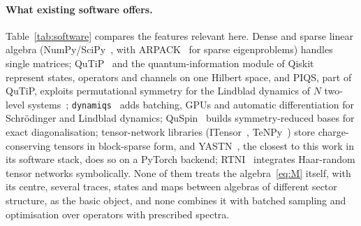 \documentclass[11pt]{article}
\begin{document}
\paragraph{What existing software offers.} Table~\ref{tab:software} compares the features relevant here.
Dense and sparse linear algebra (NumPy/SciPy~\cite{harris2020,virtanen2020}, with ARPACK~\cite{lehoucq1998} for
sparse eigenproblems) handles single matrices; QuTiP~\cite{johansson2013,lambert2026} and the quantum-information module of
Qiskit~\cite{qiskit2019} represent states, operators and channels on one Hilbert space, and PIQS, part of QuTiP,
exploits permutational symmetry for the Lindblad dynamics of $N$ two-level systems~\cite{shammah2018}; \texttt{dynamiqs}~\cite{dynamiqs}
adds batching, GPUs and automatic differentiation for Schrödinger and Lindblad dynamics; QuSpin~\cite{weinberg2017}
builds symmetry-reduced bases for exact diagonalisation; tensor-network libraries (ITensor~\cite{fishman2022},
TeNPy~\cite{hauschild2018}) store charge-conserving tensors in block-sparse form, and YASTN~\cite{rams2025}, the
closest to this work in its software stack, does so on a PyTorch backend; RTNI~\cite{fukuda2019} integrates
Haar-random tensor networks symbolically. None of them treats the algebra~\eqref{eq:M} itself, with its centre,
several traces, states and maps between algebras of different sector structure, as the basic object, and none
combines it with batched sampling and optimisation over operators with prescribed spectra.
\end{document}
